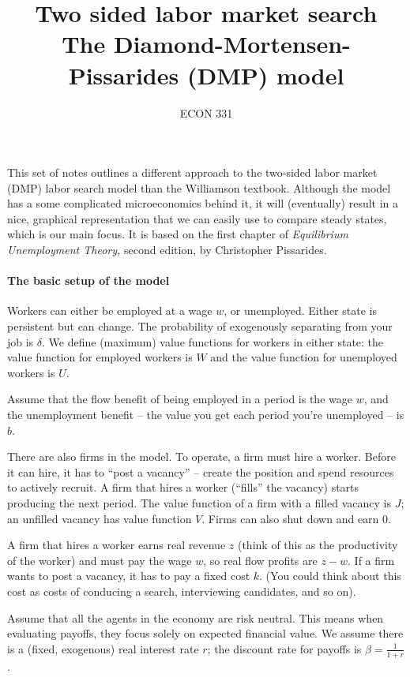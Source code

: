 \documentclass[12pt]{article}
\begin{document}
	
	\title{Two sided labor market search\\The Diamond-Mortensen-Pissarides (DMP) model}
	\author{ECON 331}
	\date{}
	\maketitle
	


	
	
This set of notes outlines a different approach to the two-sided labor market (DMP) labor search model than the Williamson textbook.   Although the model has a some complicated microeconomics behind it, it will (eventually) result in a nice, graphical representation that we can easily use to compare steady states, which is our main focus.  It is based on the first chapter of \textit{Equilibrium Unemployment Theory,} second edition, by Christopher Pissarides.


\paragraph{The basic setup of the model} Workers can either be employed at a wage $w$, or unemployed.  Either state is persistent but can change. The probability of exogenously separating from your job is $\delta$.  We define (maximum) value functions for workers in either state: the value function for employed workers is $W$ and the value function for unemployed workers is $U$. 

Assume that the flow benefit of being employed in a period is the wage $w$, and the unemployment benefit  -- the value you get each period you're unemployed --  is $b$.

There are also firms in the model.  To operate, a firm must hire a worker.  Before it can hire, it has to  ``post a vacancy'' --  create the position and spend resources to actively recruit.  A firm that hires a worker (``fills'' the vacancy) starts producing the next period.  The value function of a firm with a filled vacancy is $J$; an unfilled vacancy has value function $V$.  Firms can also shut down and earn 0.  

A firm that hires a worker earns real revenue $z$ (think of this as the productivity of the worker) and must pay the wage $w$, so real flow profits are $z - w$.  If a firm wants to post a vacancy, it has to pay a fixed cost $k$.  (You could think about this cost as costs of conducing a search, interviewing candidates, and so on).

Assume that all the agents in the economy are risk neutral. This means when evaluating payoffs, they focus solely on expected financial value. We assume there is a (fixed, exogenous) real interest rate $r$; the discount rate for payoffs is  $\beta = \frac{1}{1+r}$.
\end{document}

